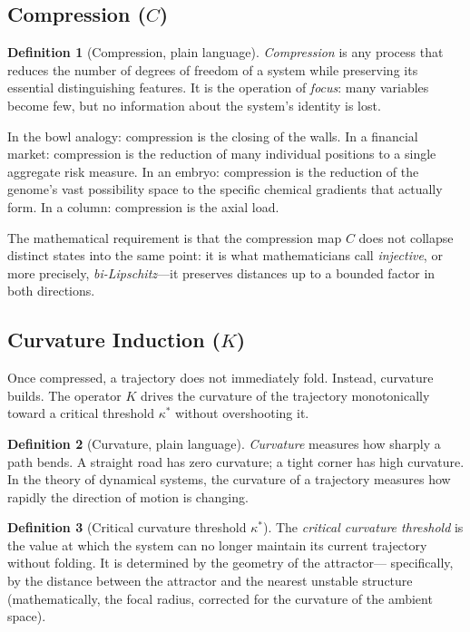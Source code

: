 \documentclass[12pt, oneside]{book}
\theoremstyle{plain}
\theoremstyle{definition}
\newtheorem{definition}{Definition}[chapter]
\theoremstyle{remark}
\begin{document}
\subsection{Compression ($C$)}

\begin{definition}[Compression, plain language]
\emph{Compression} is any process that reduces the number of
degrees of freedom of a system while preserving its essential
distinguishing features. It is the operation of \emph{focus}:
many variables become few, but no information about the
system's identity is lost.
\end{definition}

In the bowl analogy: compression is the closing of the walls.
In a financial market: compression is the reduction of many
individual positions to a single aggregate risk measure. In an
embryo: compression is the reduction of the genome's vast
possibility space to the specific chemical gradients that
actually form. In a column: compression is the axial load.

The mathematical requirement is that the compression map $C$
does not collapse distinct states into the same point: it is
what mathematicians call \emph{injective}, or more precisely,
\emph{bi-Lipschitz}---it preserves distances up to a bounded
factor in both directions.

\subsection{Curvature Induction ($K$)}

Once compressed, a trajectory does not immediately fold. Instead,
curvature builds. The operator $K$ drives the curvature of the
trajectory monotonically toward a critical threshold $\kappa^*$
without overshooting it.

\begin{definition}[Curvature, plain language]
\emph{Curvature} measures how sharply a path bends. A straight
road has zero curvature; a tight corner has high curvature.
In the theory of dynamical systems, the curvature of a
trajectory measures how rapidly the direction of motion is
changing.
\end{definition}

\begin{definition}[Critical curvature threshold $\kappa^*$]
The \emph{critical curvature threshold} is the value at which
the system can no longer maintain its current trajectory without
folding. It is determined by the geometry of the attractor---
specifically, by the distance between the attractor and the
nearest unstable structure (mathematically, the focal radius,
corrected for the curvature of the ambient space).
\end{definition}
\end{document}
